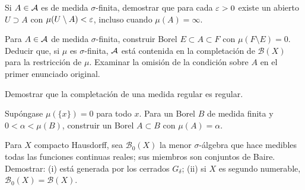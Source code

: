 \begin{ejercicio}\label{ej:v2-l31-4}
Si $A\in\mathcal A$ es de medida $\sigma$-finita, demostrar que para cada $\varepsilon>0$ existe un abierto $U\supset A$ con $\mu(U\setminus A)<\varepsilon$, incluso cuando $\mu(A)=\infty$.
\end{ejercicio}

\begin{ejercicio}\label{ej:v2-l31-5}
Para $A\in\mathcal A$ de medida $\sigma$-finita, construir Borel $E\subset A\subset F$ con $\mu(F\setminus E)=0$. Deducir que, si $\mu$ es $\sigma$-finita, $\mathcal A$ está contenida en la completación de $\mathcal B(X)$ para la restricción de $\mu$. Examinar la omisión de la condición sobre $A$ en el primer enunciado original.
\end{ejercicio}

\begin{ejercicio}\label{ej:v2-l31-6}
Demostrar que la completación de una medida regular es regular.
\end{ejercicio}

\begin{ejercicio}\label{ej:v2-l31-7}
Supóngase $\mu(\{x\})=0$ para todo $x$. Para un Borel $B$ de medida finita y $0<\alpha<\mu(B)$, construir un Borel $A\subset B$ con $\mu(A)=\alpha$.
\end{ejercicio}

\begin{ejercicio}\label{ej:v2-l31-8}
Para $X$ compacto Hausdorff, sea $\mathcal B_0(X)$ la menor $\sigma$-álgebra que hace medibles todas las funciones continuas reales; sus miembros son conjuntos de Baire. Demostrar: (i) está generada por los cerrados $G_\delta$; (ii) si $X$ es segundo numerable, $\mathcal B_0(X)=\mathcal B(X)$.
\end{ejercicio}


